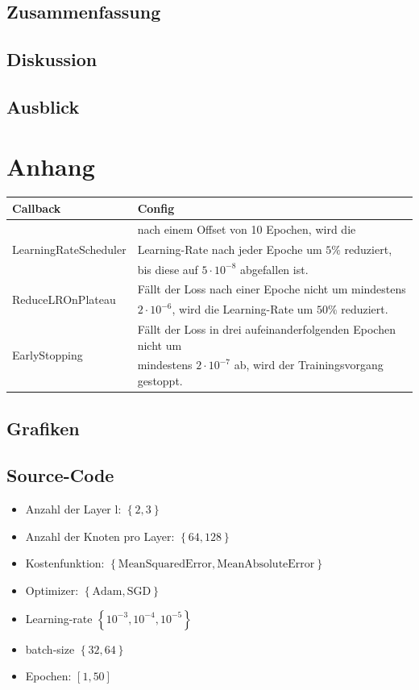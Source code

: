 \section{Zusammenfassung}
\section{Diskussion}
\section{Ausblick}


\appendix
\chapter{Anhang}
\begin{table}
	\centering
	\begin{tabular}{|l|l|}
		\hline
		Callback & Config \\
		\hline
		\multirow{3}{*}{LearningRateScheduler} & nach einem Offset von 10 Epochen, wird die \\
		& Learning-Rate nach jeder Epoche um $5\%$ reduziert, \\
		& bis diese auf $5 \cdot 10^{-8}$ abgefallen ist. \\
		\hline
		\multirow{2}{*}{ReduceLROnPlateau}& Fällt der Loss nach einer Epoche nicht um mindestens\\
		& $2 \cdot 10^{-6}$, wird die Learning-Rate um $50\%$ reduziert.\\
		\hline
		\multirow{2}{*}{EarlyStopping}& Fällt der Loss in drei aufeinanderfolgenden Epochen nicht um  \\ 
		& mindestens $2 \cdot 10^{-7}$ ab, wird der Trainingsvorgang gestoppt.\\
		\hline
	\end{tabular}
	\label{callbacks}
\end{table}
\section{Grafiken}
\section{Source-Code}


%


\begin{itemize}
	\item Anzahl der Layer l: $\left\lbrace2, 3\right\rbrace$  
	\item Anzahl der Knoten pro Layer: $\left\lbrace64, 128 \right\rbrace $
	\item Kostenfunktion: $\left\lbrace \text{MeanSquaredError}, \text{MeanAbsoluteError} \right\rbrace$
	\item Optimizer: $\left\lbrace \text{Adam}, \text{SGD} \right\rbrace$
	\item Learning-rate $\left\lbrace 10^{-3}, 10^{-4}, 10^{-5} \right\rbrace$
	\item batch-size $\left\lbrace 32, 64 \right\rbrace$
	\item Epochen: $\left[1,50\right]$
\end{itemize}

